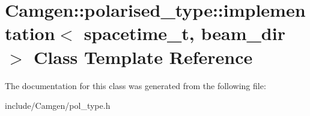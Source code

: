\hypertarget{a00298}{}\section{Camgen\+:\+:polarised\+\_\+type\+:\+:implementation$<$ spacetime\+\_\+t, beam\+\_\+dir $>$ Class Template Reference}
\label{a00298}


The documentation for this class was generated from the following file\+:\begin{DoxyCompactItemize}
\item 
include/\+Camgen/pol\+\_\+type.\+h\end{DoxyCompactItemize}
